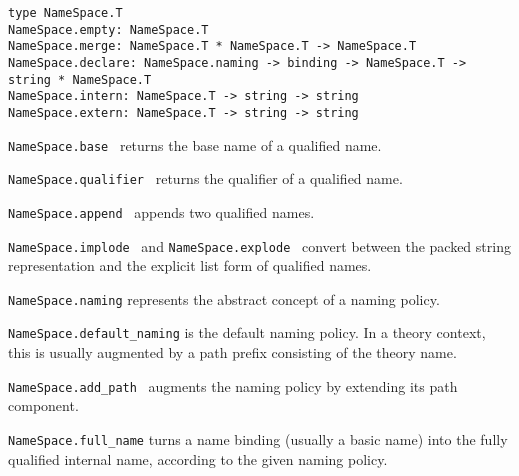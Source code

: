 \begin{isabellebody}
\begin{isamarkuptext}
  \begin{mldecls}
  \verb|type NameSpace.T| \\
  \verb|NameSpace.empty: NameSpace.T| \\
  \verb|NameSpace.merge: NameSpace.T * NameSpace.T -> NameSpace.T| \\
  \verb|NameSpace.declare: NameSpace.naming -> binding -> NameSpace.T -> string * NameSpace.T| \\
  \verb|NameSpace.intern: NameSpace.T -> string -> string| \\
  \verb|NameSpace.extern: NameSpace.T -> string -> string| \\
  \end{mldecls}

  \begin{description}

  \item \verb|NameSpace.base|~ returns the base name of a
  qualified name.

  \item \verb|NameSpace.qualifier|~ returns the qualifier
  of a qualified name.

  \item \verb|NameSpace.append|~
  appends two qualified names.

  \item \verb|NameSpace.implode|~ and \verb|NameSpace.explode|~ convert between the packed string
  representation and the explicit list form of qualified names.

  \item \verb|NameSpace.naming| represents the abstract concept of
  a naming policy.

  \item \verb|NameSpace.default_naming| is the default naming policy.
  In a theory context, this is usually augmented by a path prefix
  consisting of the theory name.

  \item \verb|NameSpace.add_path|~ augments the
  naming policy by extending its path component.

  \item \verb|NameSpace.full_name| turns a name
  binding (usually a basic name) into the fully qualified
  internal name, according to the given naming policy.


\end{description}
\end{isamarkuptext}
\end{isabellebody}
